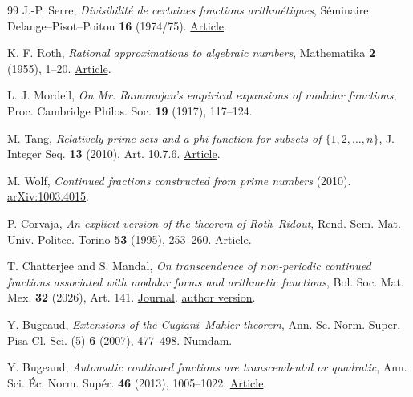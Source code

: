 \documentclass[11pt,a4paper]{article}
\begin{document}
\begin{thebibliography}{99}
 J.-P. Serre, \emph{Divisibilité de certaines fonctions arithmétiques}, Séminaire Delange--Pisot--Poitou \textbf{16} (1974/75). \href{https://www.numdam.org/item/SDPP_1974-1975__16_1_A15_0/}{Article}.

 K. F. Roth, \emph{Rational approximations to algebraic numbers}, Mathematika \textbf{2} (1955), 1--20. \href{https://doi.org/10.1112/S0025579300000644}{Article}.

 L. J. Mordell, \emph{On Mr. Ramanujan's empirical expansions of modular functions}, Proc. Cambridge Philos. Soc. \textbf{19} (1917), 117--124.

 M. Tang, \emph{Relatively prime sets and a phi function for subsets of \(\{1,2,\ldots,n\}\)}, J. Integer Seq. \textbf{13} (2010), Art. 10.7.6. \href{https://cs.uwaterloo.ca/journals/JIS/VOL13/Tang/tang2.pdf}{Article}.

 M. Wolf, \emph{Continued fractions constructed from prime numbers} (2010). \href{https://arxiv.org/abs/1003.4015}{arXiv:1003.4015}.

 P. Corvaja, \emph{An explicit version of the theorem of Roth--Ridout}, Rend. Sem. Mat. Univ. Politec. Torino \textbf{53} (1995), 253--260. \href{https://seminariomatematico.polito.it/rendiconti/cartaceo/53-3/253.pdf}{Article}.

 T. Chatterjee and S. Mandal, \emph{On transcendence of non-periodic continued fractions associated with modular forms and arithmetic functions}, Bol. Soc. Mat. Mex. \textbf{32} (2026), Art. 141. \href{https://doi.org/10.1007/s40590-026-00974-2}{Journal}. \href{https://arxiv.org/abs/2602.13300}{author version}.

 Y. Bugeaud, \emph{Extensions of the Cugiani--Mahler theorem}, Ann. Sc. Norm. Super. Pisa Cl. Sci. (5) \textbf{6} (2007), 477--498. \href{https://www.numdam.org/item/ASNSP_2007_5_6_3_477_0/}{Numdam}.

 Y. Bugeaud, \emph{Automatic continued fractions are transcendental or quadratic}, Ann. Sci. Éc. Norm. Supér. \textbf{46} (2013), 1005--1022. \href{https://doi.org/10.24033/asens.2208}{Article}.

\end{thebibliography}
\end{document}
